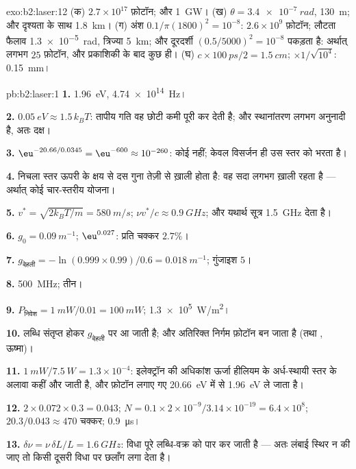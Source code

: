 \begin{solution}{exo:b2:laser:12}
(क) $2.7 \times 10^{17}$ फ़ोटॉन; और \qty{1}{GW}। (ख) $\theta = \qty{3.4e-7}{rad}$,
\qty{130}{m}; और दृश्यता के साथ \qty{1.8}{km}। (ग) अंश $0.1/\pi(1800)^2 =
10^{-8}$: $2.6 \times 10^9$ फ़ोटॉन; लौटता फैलाव \qty{1.3e-5}{rad}, त्रिज्या
\qty{5}{km}; और दूरदर्शी $(0.5/5000)^2 = 10^{-8}$ पकड़ता है: अर्थात् लगभग $25$
फ़ोटॉन, और प्रकाशिकी के बाद कुछ ही। (घ) $c \times \qty{100}{ps}/2 = \qty{1.5}{cm}$;
$\times 1/\sqrt{10^4}$: \qty{0.15}{mm}।
\end{solution}

\begin{solution}{pb:b2:laser:1}
\textbf{1.} \qty{1.96}{eV}, \qty{4.74e14}{Hz}।

\textbf{2.} $\qty{0.05}{eV} \approx 1.5\,k_BT$: तापीय गति वह छोटी कमी
पूरी कर देती है; और स्थानांतरण लगभग अनुनादी है, अतः दक्ष।

\textbf{3.} $\eu^{-20.66/0.0345} = \eu^{-600} \approx 10^{-260}$: कोई नहीं; केवल
विसर्जन ही उस स्तर को भरता है।

\textbf{4.} निचला स्तर ऊपरी के क्षय से दस गुना तेज़ी से ख़ाली होता
है: वह सदा लगभग ख़ाली रहता है --- अर्थात् कोई चार-स्तरीय योजना।

\textbf{5.} $v^* = \sqrt{2k_BT/m} = \qty{580}{m/s}$; $\nu v^*/c \approx \qty{0.9}{GHz}$;
और यथार्थ सूत्र \qty{1.5}{GHz} देता है।

\textbf{6.} $g_0 = \qty{0.09}{m^{-1}}$; $\eu^{0.027}$: प्रति चक्कर $2.7\%$।

\textbf{7.} $g_{\text{देहली}} = -\ln(0.999 \times 0.99)/0.6 = \qty{0.018}{m^{-1}}$;
गुंजाइश $5$।

\textbf{8.} \qty{500}{MHz}; तीन।

\textbf{9.} $P_{\text{निवेश}} = \qty{1}{mW}/0.01 = \qty{100}{mW}$; \qty{1.3e5}{W/m^2}।

\textbf{10.} लब्धि संतृप्त होकर $g_{\text{देहली}}$ पर आ जाती है; और अतिरिक्त
निर्गम फ़ोटॉन बन जाता है (तथा , ऊष्मा)।

\textbf{11.} $\qty{1}{mW}/\qty{7.5}{W} = 1.3 \times 10^{-4}$: इलेक्ट्रॉन की
अधिकांश ऊर्जा हीलियम के अर्ध-स्थायी स्तर के अलावा कहीं और जाती है, और
फ़ोटॉन लगाए गए \qty{20.66}{eV} में से \qty{1.96}{eV} ले जाता है।

\textbf{12.} $2 \times 0.072 \times 0.3 = 0.043$; $N = 0.1 \times 2 \times 10^{-9}/3.14
\times 10^{-19} = 6.4 \times 10^8$; $20.3/0.043 \approx 470$ चक्कर;
\qty{0.9}{\micro s}।

\textbf{13.} $\delta\nu = \nu\,\delta L/L = \qty{1.6}{GHz}$: विधा पूरे
लब्धि-वक्र को पार कर जाती है --- अतः लंबाई स्थिर न की जाए तो  किसी दूसरी
विधा पर छलाँग लगा देता है।


\end{solution}
